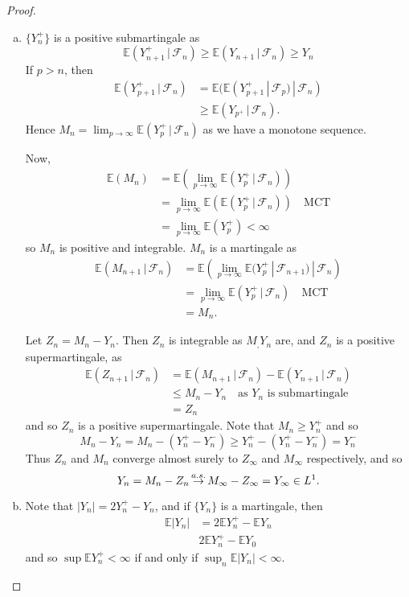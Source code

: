 \documentclass[10pt, oneside, reqno]{amsart}
\theoremstyle{plain}%
\theoremstyle{definition}
\theoremstyle{remark}
\newcommand{\given}{ \, | \,}
\newcommand{\sigf}{\mathcal{F}}
\newcommand{\E}{\mathbb{E}}
\def\cas{\,{\buildrel a.s. \over \rightarrow}\,}
\begin{document}
\begin{proof}{\ }
    \begin{enumerate}[(a)]
        \item $\{ Y_n^+ \}$ is a positive submartingale as \[
            \E(Y_{n+1}^+ \given \sigf_n) \geq \E(Y_{n+1} \given \sigf_n) \geq Y_n
        \]  If $p > n$, then \begin{align*}
            \E(Y_{p+1}^+ \given \sigf_n) &= \E(\E(Y_{p+1}^+ \given \sigf_p) \given \sigf_n) \\
            &\geq \E(Y_{p^+} \given \sigf_n). 
        \end{align*}   Hence $M_n = \lim_{p \rightarrow \infty}\E(Y_p^+ \given \sigf_n)$ as we have a monotone sequence.   
        
        Now, \begin{align*}
            \E(M_n) &= \E\left(\lim_{p \rightarrow \infty} \E(Y_p^+ \given \sigf_n) \right) \\
            &= \lim_{p \rightarrow \infty} \E(\E( Y_p^+ \given \sigf_n)) \quad \text{MCT} \\
            &= \lim_{p \rightarrow \infty} \E(Y_p^+) < \infty
        \end{align*} so $M_n$ is positive and integrable.  $M_n$ is a martingale as \begin{align*}
            \E(M_{n+1} \given \sigf_n) &= \E\left(\lim_{p \rightarrow \infty} \E(Y_p^+ \given \sigf_{n+1}) \given \sigf_n \right)  \\
            &= \lim_{p \rightarrow \infty} \E(Y_p^+ \given \sigf_n) \quad \text{MCT} \\
            &= M_n.
        \end{align*}  
        
        Let $Z_n = M_n - Y_n$. Then $Z_n$ is integrable as $M_, Y_n$ are, and $Z_n$ is a positive supermartingale, as \begin{align*}
            \E(Z_{n+1} \given \sigf_n) &= \E(M_{n+1} \given \sigf_n) - \E(Y_{n+1} \given \sigf_n) \\
            &\leq M_n - Y_n \quad \text{as $Y_n$ is submartingale} \\
            &= Z_n
        \end{align*} and so $Z_n$ is a positive supermartingale.  Note that $M_n \geq Y_{n}^+$ and so \[
            M_n - Y_n = M_n -(Y_n^+ - Y_n^-) \geq Y_n^+ - (Y_n^+ - Y_n^-) = Y_n^-
        \]  Thus $Z_n$ and $M_n$ converge almost surely to $Z_\infty$ and $M_\infty$ respectively, and so \[
            Y_n = M_n - Z_n \cas M_\infty - Z_\infty = Y_\infty \in L^1.  
        \]
        \item Note that $|Y_n| = 2Y_n^+ - Y_n$, and if $\{ Y_n \}$ is a martingale, then \begin{align*}
            \E |Y_n| &= 2 \E Y_n^+ - \E Y_n \\
            & 2 \E Y_n^+ - \E Y_0 
        \end{align*} and so $\sup \E Y_n^+ < \infty$ if and only if $\sup_n \E |Y_n| < \infty$.  
    \end{enumerate}
\end{proof}
\end{document}
